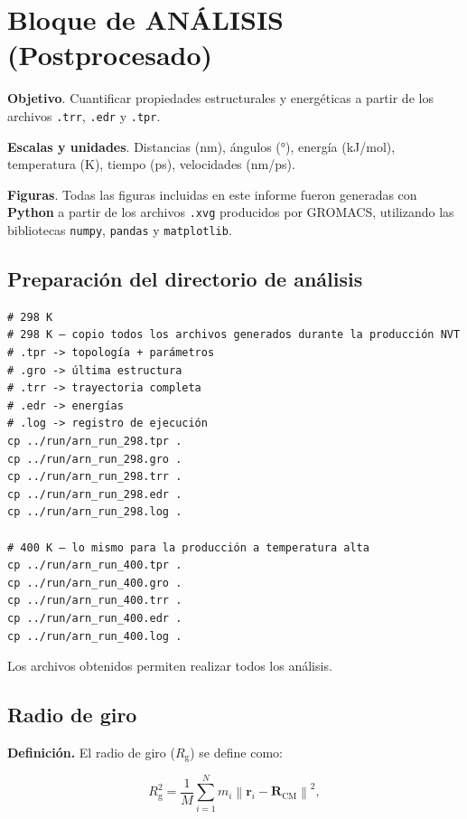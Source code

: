 \documentclass[12pt,a4paper]{article}
\begin{document}
\section{Bloque de ANÁLISIS (Postprocesado)}
\label{sec:analisis}

\noindent
\textbf{Objetivo}. Cuantificar propiedades estructurales y energéticas a partir de los archivos \texttt{.trr}, \texttt{.edr} y \texttt{.tpr}.

\noindent
\textbf{Escalas y unidades}. Distancias (nm), ángulos (°), energía (kJ/mol), temperatura (K), tiempo (ps), velocidades (nm/ps).

\noindent
\textbf{Figuras}. Todas las figuras incluidas en este informe fueron generadas con \textbf{Python} a partir de los archivos \texttt{.xvg} producidos por GROMACS, utilizando las bibliotecas \texttt{numpy}, \texttt{pandas} y \texttt{matplotlib}.
\subsection{Preparación del directorio de análisis}

\begin{lstlisting}[style=bashstyle]
# 298 K
# 298 K — copio todos los archivos generados durante la producción NVT
# .tpr -> topología + parámetros
# .gro -> última estructura
# .trr -> trayectoria completa
# .edr -> energías
# .log -> registro de ejecución
cp ../run/arn_run_298.tpr .
cp ../run/arn_run_298.gro .
cp ../run/arn_run_298.trr .
cp ../run/arn_run_298.edr .
cp ../run/arn_run_298.log .

# 400 K — lo mismo para la producción a temperatura alta
cp ../run/arn_run_400.tpr .
cp ../run/arn_run_400.gro .
cp ../run/arn_run_400.trr .
cp ../run/arn_run_400.edr .
cp ../run/arn_run_400.log .
\end{lstlisting}

Los archivos obtenidos permiten realizar todos los análisis.

\subsection{Radio de giro}

\noindent\textbf{Definición.} El radio de giro (\(R_{\mathrm{g}}\)) se define como:

\[
R_{\mathrm{g}}^{2} = \frac{1}{M} \sum_{i=1}^{N} m_i \left\lVert \mathbf{r}_i - \mathbf{R}_{\mathrm{CM}} \right\rVert^2,
\]
\end{document}
